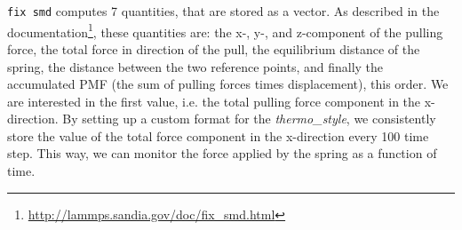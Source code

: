 \documentclass[twoside,english]{uiofysmaster}
\begin{document}
\texttt{fix smd} computes 7 quantities, that are stored as a vector. 
As described in the documentation\footnote{\href{http://lammps.sandia.gov/doc/fix_smd.html}{\url{http://lammps.sandia.gov/doc/fix_smd.html}}}, 
these quantities are:  the x-, y-, and z-component of the pulling force, the total force in direction of the pull, the equilibrium distance of the spring, the distance between the two reference points, and finally the accumulated PMF (the sum of pulling forces times displacement), this order.
We are interested in the first value, i.e. the total pulling force component in the x-direction.
By setting up a custom format for the \textit{thermo\_style}, we consistently store the value of the total force component in the x-direction every 100 time step. 
This way, we can monitor the force applied by the spring as a function of time.
\end{document}
